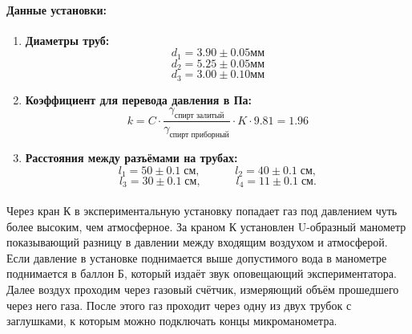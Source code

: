\documentclass[a4paper,12pt]{article}
\begin{document}
\paragraph{Данные установки:}
\begin{enumerate}
\itemsep0em
\item
\textbf{Диаметры труб:}
\[d_1 = 3.90 \pm 0.05 \text{мм}\]
\[d_2 = 5.25 \pm 0.05 \text{мм}\]
\[d_3 = 3.00 \pm 0.10 \text{мм}\]
\item 
\textbf{Коэффициент для перевода давления в Па:}
\[k =  C \cdot \dfrac{\gamma_{\text{спирт залитый}}}{\gamma_{\text{спирт приборный}}}\cdot K \cdot 9.81 = 1.96\]
\item\textbf{ Расстояния между разъёмами на трубах:}
	\[
		l_1 = 50 \pm 0.1 \; \text{см},	\;\;\;\;\;\;\;\;\;\;\; l_2 = 40 \pm 0.1 \; \text{см},
	\]\[
		l_3 = 30 \pm 0.1 \; \text{см}, \;\;\;\;\;\;\;\;\;\;\; l_4 = 11 \pm 0.1 \; \text{см}.	
	\]
\end{enumerate}
\paragraph{}
Через кран К в экспериментальную установку попадает газ под давлением чуть более высоким, чем атмосферное.
За краном К установлен U-образный манометр показывающий разницу в давлении между входящим воздухом и атмосферой. 
Если давление в установке поднимается выше допустимого вода в манометре поднимается в баллон Б, который издаёт звук оповещающий экспериментатора.
Далее воздух проходим через газовый счётчик, измеряющий объём прошедшего через него газа.
После этого газ проходит через одну из двух трубок с заглушками, к которым можно подключать концы микроманометра.
\paragraph{}
\end{document}

